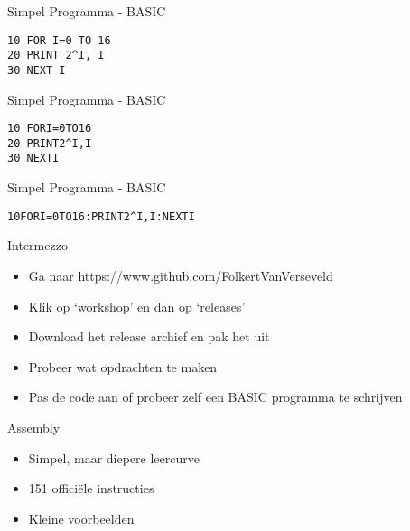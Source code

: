 \documentclass[aspectratio=43]{uva-inf-presentation}
\begin{document}

\begin{frame}[fragile]{Simpel Programma - BASIC}

\begin{lstlisting}
10 FOR I=0 TO 16
20 PRINT 2^I, I
30 NEXT I
\end{lstlisting}

\end{frame}


\begin{frame}[fragile]{Simpel Programma - BASIC}

\begin{lstlisting}
10 FORI=0TO16
20 PRINT2^I,I
30 NEXTI
\end{lstlisting}

\end{frame}


\begin{frame}[fragile]{Simpel Programma - BASIC}

\begin{lstlisting}
10FORI=0TO16:PRINT2^I,I:NEXTI
\end{lstlisting}

\end{frame}


\begin{frame}{Intermezzo}

\begin{itemize}
\item Ga naar https://www.github.com/FolkertVanVerseveld
\item Klik op `workshop' en dan op `releases'
\item Download het release archief en pak het uit
\item Probeer wat opdrachten te maken
\item Pas de code aan of probeer zelf een BASIC programma te schrijven
\end{itemize}

\end{frame}


\begin{frame}{Assembly}

\begin{itemize}
\item Simpel, maar diepere leercurve
\item 151 offici\"ele instructies
\item Kleine voorbeelden
\end{itemize}

\end{frame}
\end{document}
